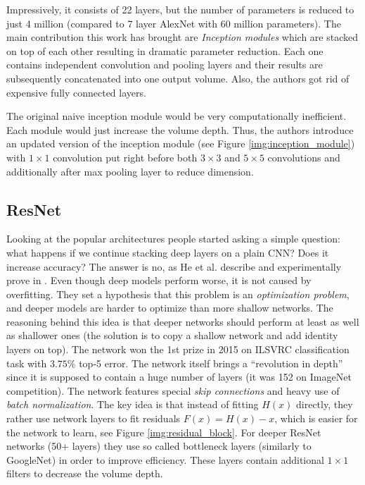Impressively, it consists of 22 layers, but the number of
parameters is reduced to just 4 million (compared to 7 layer AlexNet with 60 million
parameters). The main contribution this work has brought are \textit{Inception modules} which
are stacked on top of each other resulting in dramatic parameter reduction. Each one
contains independent convolution and pooling layers and their results are subsequently
concatenated into one output volume. Also, the
authors got rid of expensive fully connected layers.

The original naive inception module would be very computationally inefficient. Each
module would just increase the volume depth. Thus, the authors introduce an updated version
of the inception module (see Figure \ref{img:inception_module})
with $1\times1$ convolution put right before both $3\times3$ and
$5\times5$ convolutions and additionally after max pooling layer to reduce dimension.

\subsection{ResNet}
\label{sec:cnn_rw:resnet}

Looking at the popular architectures people started asking a simple question:
what happens if we continue stacking
deep layers on a plain CNN? Does it increase accuracy? The answer is no, as
He et al. describe and experimentally prove in \cite{bib:he2016deep}. Even though
deep models perform worse, it is not caused by overfitting.
They set a hypothesis
that this problem is an \textit{optimization problem}, and deeper models are harder to
optimize than more shallow networks. The reasoning behind this idea is that deeper networks
should perform at least as well as shallower ones (the solution is to copy
a shallow network and add identity layers on top).
The network won the 1st prize in 2015 on ILSVRC classification
task with $3.75\%$ top-5 error.
The network itself brings a ``revolution in depth'' since it is supposed to contain a
huge number of layers (it was 152 on ImageNet competition). The network features
special \textit{skip connections} and heavy use of \textit{batch normalization}.
The key idea is that instead of fitting $H(x)$ directly,
they rather use network layers to fit residuals $F(x) = H(x) - x$, which
is easier for the network to learn, see Figure \ref{img:residual_block}.
For deeper ResNet networks (50+ layers) they use so called bottleneck layers
(similarly to GoogleNet) in order to
improve efficiency. These layers contain additional $1\times1$ filters to decrease the
volume depth.

